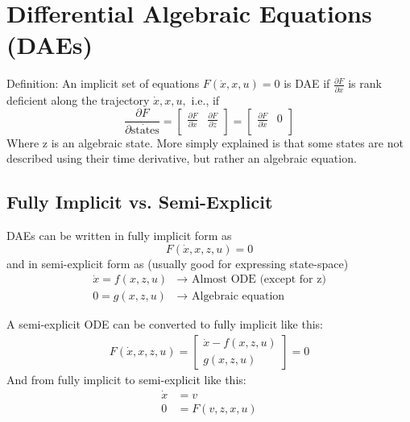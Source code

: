 \section{Differential Algebraic Equations (DAEs)}

Definition:
An implicit set of equations $F\left(\dot{x},x,u\right)=0$ is DAE if $\frac{\partial F}{\partial x}$ is rank deficient along the trajectory $\dot{x},x,u,$ i.e., if
$$
    \frac{\partial F}{\partial\dot{\mathrm{states}}}=\left[\begin{matrix}\frac{\partial F}{\partial\dot{x}}&\frac{\partial F}{\partial\dot{z}}\\\end{matrix}\right]=\left[\begin{matrix}\frac{\partial F}{\partial\dot{x}}&0\\\end{matrix}\right]
$$
Where z is an algebraic state. More simply explained is that some states are not described using their time derivative, but rather an algebraic equation.

\subsection{Fully Implicit vs. Semi-Explicit}
DAEs can be written in fully implicit form as
$$
    F\left(\dot{x},x,z,u\right) = 0
$$
and in semi-explicit form as (usually good for expressing state-space)
\begin{equation*}
    \begin{split}
        \dot x=f(x,z,u) &\rightarrow \text{ Almost ODE (except for z)}\\
        0=g(x,z,u) &\rightarrow \text{ Algebraic equation}
    \end{split}
\end{equation*}

A semi-explicit ODE can be converted to fully implicit like this:
\begin{equation*}
    \begin{split}
        F(\dot{x},x,z,u)=
        \begin{bmatrix}
        \dot{x}-f(x,z,u) \\ g(x,z,u)
        \end{bmatrix}
        =0
    \end{split}
\end{equation*}
And from fully implicit to semi-explicit like this:
\begin{equation*}
    \begin{split}
        \dot x &= v \\
        0 &= F(v,z,x,u)
    \end{split} 
\end{equation*}

